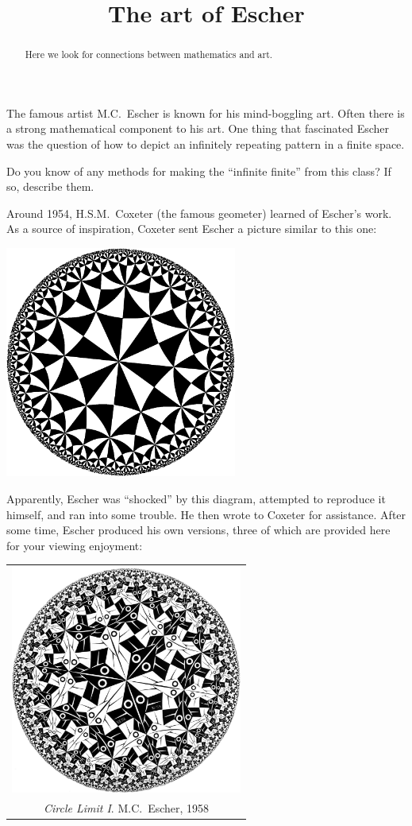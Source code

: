 \documentclass{ximera}
\title{The art of Escher}
\begin{document}
\begin{abstract}
Here we look for connections between mathematics and art.
\end{abstract}
\maketitle

The famous artist M.C.\ Escher is known for his mind-boggling
art. Often there is a strong mathematical component to his art. One
thing that fascinated Escher was the question of how to depict an
infinitely repeating pattern in a finite space.

\begin{problem}
  Do you know of any methods for making the ``infinite finite'' from
  this class? If so, describe them.
\end{problem}

Around 1954, H.S.M.\ Coxeter (the famous geometer) learned of Escher's
work. As a source of inspiration, Coxeter sent Escher a picture
similar to this one:
\begin{image}
  \includegraphics[width=3in]{inspiredCircleLimitIII.pdf}
\end{image}
Apparently, Escher was ``shocked'' by this diagram, attempted to
reproduce it himself, and ran into some trouble. He then wrote to
Coxeter for assistance. After some time, Escher produced his own
versions, three of which are provided here for your viewing enjoyment:

\begin{image}
  \begin{tabular}{c}
  \includegraphics[width=3in]{circleLimitI.jpg}\\
  \textit{Circle Limit I}. M.C.\ Escher, 1958
  \end{tabular}
\end{image}
\end{document}
